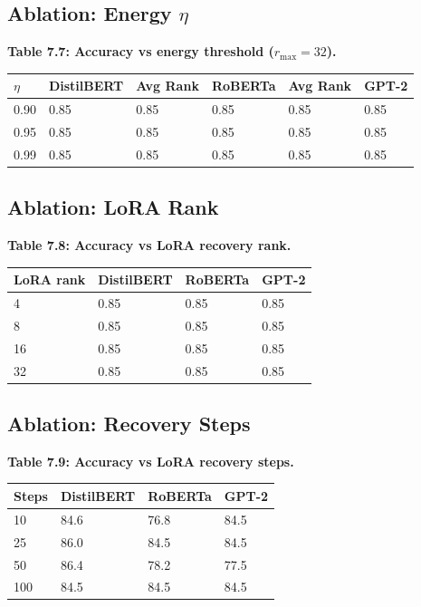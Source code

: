 \subsection{Ablation: Energy $\eta$}

\textbf{Table 7.7: Accuracy vs energy threshold ($r_\text{max} = 32$).}

\begin{table}[H]
\centering
\small
\begin{tabular}{llllll}
\toprule
\textbf{$\eta$} & \textbf{DistilBERT} & \textbf{Avg Rank} & \textbf{RoBERTa} & \textbf{Avg Rank} & \textbf{GPT-2} \\
\midrule
0.90 & 0.85 & 0.85 & 0.85 & 0.85 & 0.85 \\
0.95 & 0.85 & 0.85 & 0.85 & 0.85 & 0.85 \\
0.99 & 0.85 & 0.85 & 0.85 & 0.85 & 0.85 \\
\bottomrule
\end{tabular}
\end{table}

\subsection{Ablation: LoRA Rank}

\textbf{Table 7.8: Accuracy vs LoRA recovery rank.}

\begin{table}[H]
\centering
\small
\begin{tabular}{llll}
\toprule
\textbf{LoRA rank} & \textbf{DistilBERT} & \textbf{RoBERTa} & \textbf{GPT-2} \\
\midrule
4 & 0.85 & 0.85 & 0.85 \\
8 & 0.85 & 0.85 & 0.85 \\
16 & 0.85 & 0.85 & 0.85 \\
32 & 0.85 & 0.85 & 0.85 \\
\bottomrule
\end{tabular}
\end{table}

\subsection{Ablation: Recovery Steps}

\textbf{Table 7.9: Accuracy vs LoRA recovery steps.}

\begin{table}[H]
\centering
\small
\begin{tabular}{llll}
\toprule
\textbf{Steps} & \textbf{DistilBERT} & \textbf{RoBERTa} & \textbf{GPT-2} \\
\midrule
10 & 84.6 & 76.8 & 84.5 \\
25 & 86.0 & 84.5 & 84.5 \\
50 & 86.4 & 78.2 & 77.5 \\
100 & 84.5 & 84.5 & 84.5 \\
\bottomrule
\end{tabular}
\end{table}

